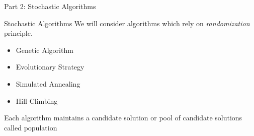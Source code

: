 \documentclass{beamer}
\begin{document}
\begin{frame}{\null}
    \begin{tcolorbox}[colback=green!5]
        \centering\Huge
        Part 2: Stochastic Algorithms
    \end{tcolorbox}
\end{frame}

\begin{frame}[t]{Stochastic Algorithms}
    We will consider algorithms which rely on \textit{randomization} principle.
    \vspace{10px}
\begin{itemize} \itemsep1.5em
        \item Genetic Algorithm
        \item Evolutionary Strategy
        \item Simulated Annealing
        \item Hill Climbing
    \end{itemize}
    \vspace{5mm}
    Each algorithm maintains a candidate solution or pool of candidate solutions called population
\end{frame}
\end{document}
